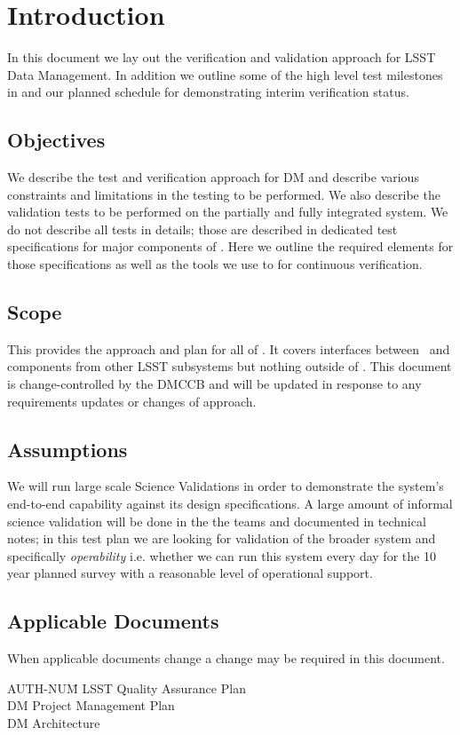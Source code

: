 
\section{Introduction \label{sect:intro}}
In this document  we lay out  the verification and validation approach for LSST Data Management. In addition we outline some of the high level test milestones in  and our planned schedule for demonstrating interim verification status.

\subsection{Objectives \label{sect:objectives}}

We describe the test and verification approach for DM and describe various constraints and limitations in the testing to be performed.
We also describe the validation tests to be performed on the partially and fully integrated system.
We do not describe all tests in details; those are described in dedicated test specifications for major components of \product. Here we outline the required elements for those specifications as well as the tools we use to for continuous verification.

\subsection{Scope \label{sect:scope}}

This provides the approach and plan for all of \product. It covers interfaces between \product\ and components from other LSST subsystems but nothing outside of \product.
This document is change-controlled by the DMCCB and will be updated in response to any requirements updates or changes of approach.

\subsection{Assumptions}
 We will run large scale Science Validations in order to demonstrate the system's end-to-end capability against its design specifications. A large amount of informal science validation will be done in the the teams and documented in technical notes; in this test plan we are looking for validation of the broader system and specifically {\em operability} i.e. whether we can run this system every day for the 10 year planned survey with a reasonable level of operational support.

\subsection{Applicable Documents \label{sect:ad}}
When applicable documents change a change may be required in this document.
\begin{tabbing}
AUTH-NUM\= \kill
{}\>	LSST Quality  Assurance Plan \\
 \>	DM Project Management Plan   \\
\>	DM Architecture\\
\end{tabbing}

